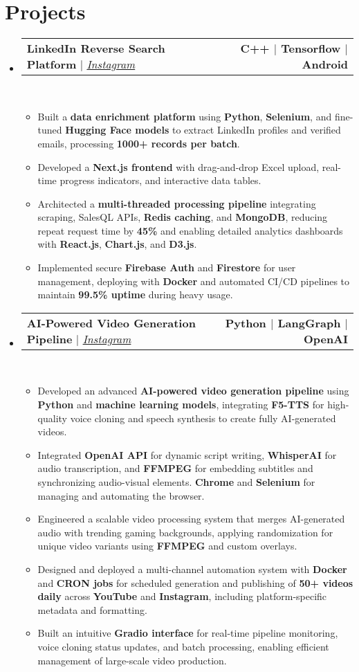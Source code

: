\documentclass[letterpaper,8pt]{article}
\makeatletter
\newcommand{\resumeItem}[1]{
  \item\small{
    {#1 \vspace{0pt}}
  }
}
\newcommand{\resumeProjectHeading}[2]{
  \item
  \begin{tabular*}{1.001\textwidth}{l@{\extracolsep{\fill}}r}
    \small#1 & \textbf{\small #2}\\
  \end{tabular*}\vspace{-7pt}
}
\newcommand{\resumeSubHeadingListStart}{\begin{itemize}[leftmargin=0.0in, label={}]}
\newcommand{\resumeSubHeadingListEnd}{\end{itemize}}\vspace{0pt}
\newcommand{\resumeItemListStart}{\begin{itemize}[leftmargin=0.15in]}
\newcommand{\resumeItemListEnd}{\end{itemize}\vspace{-5pt}}
\makeatother
\begin{document}
\section{Projects} 
  \vspace{-5pt}
    \resumeSubHeadingListStart
      \resumeProjectHeading{\textbf{{LinkedIn Reverse Search Platform}} $|$ \emph{\href{https://www.instagram.com/thatvocabguy/}{Instagram}}}{C++ $|$ Tensorflow $|$ Android} \\[5mm]
        \resumeItemListStart
          \resumeItem{Built a \textbf{data enrichment platform} using \textbf{Python}, \textbf{Selenium}, and fine-tuned \textbf{Hugging Face models} to extract LinkedIn profiles and verified emails, processing \textbf{1000+ records per batch}.}
          \resumeItem{Developed a \textbf{Next.js frontend} with drag-and-drop Excel upload, real-time progress indicators, and interactive data tables.}
          \resumeItem{Architected a \textbf{multi-threaded processing pipeline} integrating scraping, SalesQL APIs, \textbf{Redis caching}, and \textbf{MongoDB}, reducing repeat request time by \textbf{45\%} and enabling detailed analytics dashboards with \textbf{React.js}, \textbf{Chart.js}, and \textbf{D3.js}.}
          \resumeItem{Implemented secure \textbf{Firebase Auth} and \textbf{Firestore} for user management, deploying with \textbf{Docker} and automated CI/CD pipelines to maintain \textbf{99.5\% uptime} during heavy usage.}
        \resumeItemListEnd
      \vspace{-20pt}
      \resumeProjectHeading{\textbf{{AI-Powered Video Generation Pipeline}} $|$ \emph{\href{https://www.instagram.com/thatvocabguy/}{Instagram}}}{Python $|$ LangGraph $|$ OpenAI} \\[5mm]
        \resumeItemListStart
          \resumeItem{Developed an advanced \textbf{AI-powered video generation pipeline} using \textbf{Python} and \textbf{machine learning models}, integrating \textbf{F5-TTS} for high-quality voice cloning and speech synthesis to create fully AI-generated videos.}
          \resumeItem{Integrated \textbf{OpenAI API} for dynamic script writing, \textbf{WhisperAI} for audio transcription, and \textbf{FFMPEG} for embedding subtitles and synchronizing audio-visual elements. \textbf{Chrome} and \textbf{Selenium} for managing and automating the browser.}
          \resumeItem{Engineered a scalable video processing system that merges AI-generated audio with trending gaming backgrounds, applying randomization for unique video variants using \textbf{FFMPEG} and custom overlays.}
          \resumeItem{Designed and deployed a multi-channel automation system with \textbf{Docker} and \textbf{CRON jobs} for scheduled generation and publishing of \textbf{50+ videos daily} across \textbf{YouTube} and \textbf{Instagram}, including platform-specific metadata and formatting.}
          \resumeItem{Built an intuitive \textbf{Gradio interface} for real-time pipeline monitoring, voice cloning status updates, and batch processing, enabling efficient management of large-scale video production.}
        \resumeItemListEnd
    \resumeSubHeadingListEnd
    \vspace{-20pt}
\vspace{10pt}

\vspace{-15pt}
\end{document}
